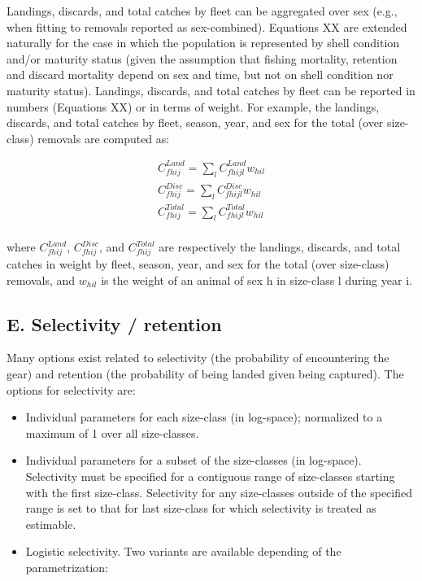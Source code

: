 \documentclass[]{article}
\providecommand{\tightlist}{%
  \setlength{\itemsep}{0pt}\setlength{\parskip}{0pt}}
\begin{document}
Landings, discards, and total catches by fleet can be aggregated over
sex (e.g., when fitting to removals reported as sex-combined). Equations
XX are extended naturally for the case in which the population is
represented by shell condition and/or maturity status (given the
assumption that fishing mortality, retention and discard mortality
depend on sex and time, but not on shell condition nor maturity status).
Landings, discards, and total catches by fleet can be reported in
numbers (Equations XX) or in terms of weight. For example, the landings,
discards, and total catches by fleet, season, year, and sex for the
total (over size-class) removals are computed as:

\begin{align}
 C^{Land}_{fhij} = \sum_{l}  C^{Land}_{fhijl}w_{hil} \\
 C^{Disc}_{fhij} = \sum_{l}  C^{Disc}_{fhijl}w_{hil} \\
 C^{Total}_{fhij} = \sum_{l}  C^{Total}_{fhijl}w_{hil} \\
\end{align}

where \(C^{Land}_{fhij}\), \(C^{Disc}_{fhij}\), and \(C^{Total}_{fhij}\)
are respectively the landings, discards, and total catches in weight by
fleet, season, year, and sex for the total (over size-class) removals,
and \(w_{hil}\) is the weight of an animal of sex h in size-class l
during year i.

\hypertarget{e.-selectivity-retention}{%
\subsection{E. Selectivity / retention}\label{e.-selectivity-retention}}

Many options exist related to selectivity (the probability of
encountering the gear) and retention (the probability of being landed
given being captured). The options for selectivity are:

\begin{itemize}
\tightlist
\item
  Individual parameters for each size-class (in log-space); normalized
  to a maximum of 1 over all size-classes.
\item
  Individual parameters for a subset of the size-classes (in log-space).
  Selectivity must be specified for a contiguous range of size-classes
  starting with the first size-class. Selectivity for any size-classes
  outside of the specified range is set to that for last size-class for
  which selectivity is treated as estimable.
\item
  Logistic selectivity. Two variants are available depending of the
  parametrization:
\end{itemize}
\end{document}
